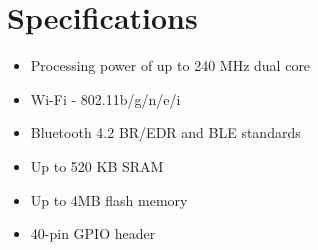 

\chapter{Specifications}

\begin{itemize}
	 \item Processing power of up to 240 MHz dual core
	 \item Wi-Fi - 802.11b/g/n/e/i
	 \item Bluetooth 4.2 BR/EDR and BLE standards
	 \item Up to 520 KB SRAM
	 \item Up to 4MB flash memory
	 \item 40-pin GPIO header
\end{itemize}


